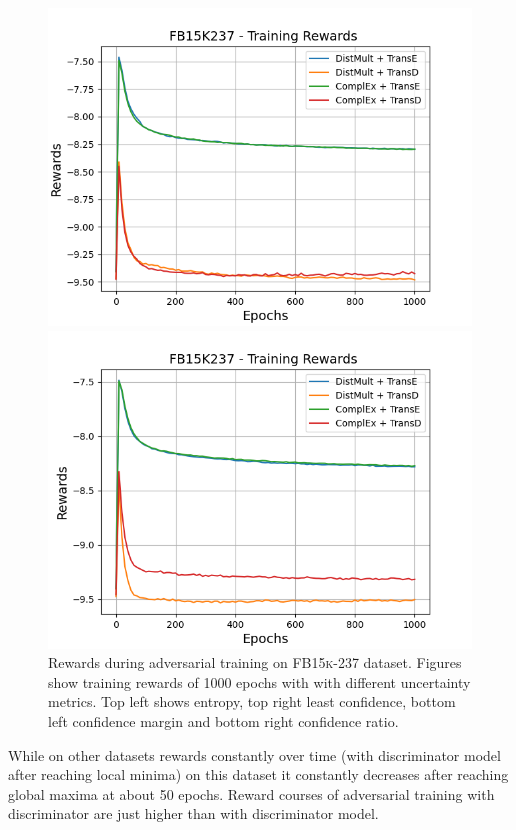 \begin{figure}
\begin{minipage}{.5\textwidth}
      \centering
      \includegraphics[width=0.9\linewidth]{figures/results/gan_train/not_pretrained/uncertainty/max_distribution/confidence_margin/fb15k237/uncertainty_fb15k237_rew.png}
    \end{minipage}%
    \begin{minipage}{.5\textwidth}
      \centering
      \includegraphics[width=0.9\linewidth]{figures/results/gan_train/not_pretrained/uncertainty/max_distribution/confidence_ratio/fb15k237/uncertainty_fb15k237_rew.png}
    \end{minipage}%
    \caption{Rewards during adversarial training on \textsc{FB15k-237} dataset. 
    Figures show training rewards of 1000 epochs with \ussoftmax with different uncertainty metrics.
    Top left shows entropy, top right least confidence, 
    bottom left confidence margin and bottom right confidence ratio.}
    \label{fig:advtrain_metrics_fb15k237_rew}
\end{figure}
While on other datasets rewards constantly over time (with \transd discriminator model after reaching local minima) on this dataset it constantly decreases after reaching global maxima at about 50 epochs.
Reward courses of adversarial training with \transe discriminator are just higher than with \transd discriminator model.
